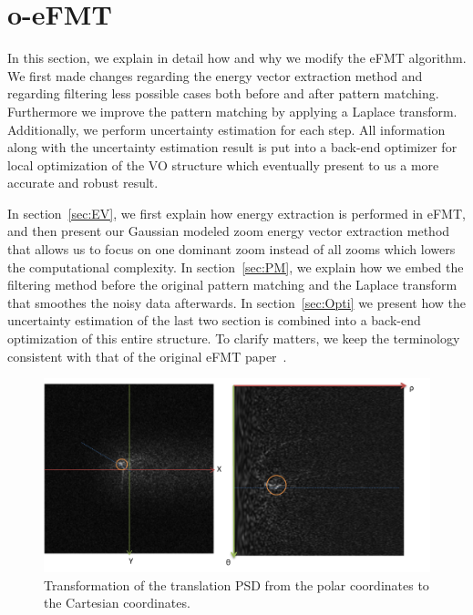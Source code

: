 \documentclass[letterpaper, 10 pt, conference]{ieeeconf}  %
\begin{document}
\section{o-eFMT}
In this section, we explain in detail how and why we modify the eFMT\cite{xu2021rethinking} algorithm. We first made changes regarding the energy vector extraction method and regarding filtering less possible cases both before and after pattern matching. Furthermore we improve the pattern matching by applying a Laplace transform. Additionally, we perform uncertainty estimation for each step. All information along with the uncertainty estimation result is put into a back-end optimizer for local optimization of the VO structure which eventually present to us a more accurate and robust result.

In section~\ref{sec:EV}, we first explain how energy extraction is performed in eFMT, and then present our Gaussian modeled zoom energy vector extraction method that allows us to focus on one dominant zoom instead of all zooms which lowers the computational complexity. In section~\ref{sec:PM}, we explain how we embed the filtering method before the original pattern matching and the Laplace transform that smoothes the noisy data afterwards. In section~\ref{sec:Opti} we present how the uncertainty estimation of the last two section is combined into a back-end optimization of this entire structure. To clarify matters, we keep the terminology consistent with that of the original eFMT paper~\cite{xu2021rethinking}.

\begin{figure}[t]
    \centering
    \includegraphics[width=0.99\linewidth]{images/eFMT-PSD.pdf}
    \caption{Transformation of the translation PSD from the polar coordinates to the Cartesian coordinates.}
    \label{fig:energy_vector}
\end{figure}
\end{document}
